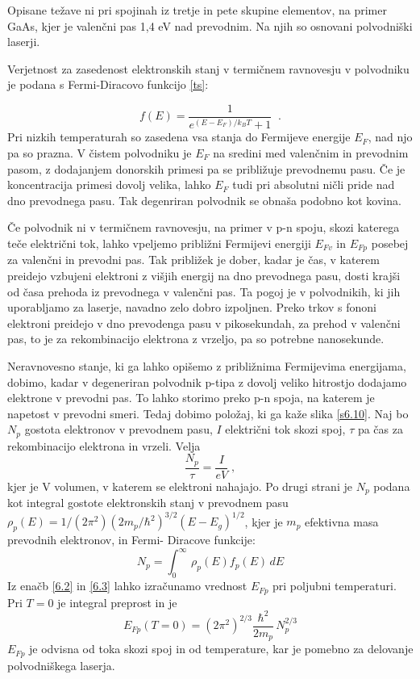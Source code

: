 Opisane težave ni pri spojinah iz tretje in pete skupine elementov, na
primer GaAs, kjer je valenčni pas 1,4 eV nad prevodnim. Na njih so osnovani
polvodniški laserji.

Verjetnost za zasedenost elektronskih stanj v termičnem ravnovesju v
polvodniku je podana s Fermi-Diracovo funkcijo \ref{ts}:

\begin{equation}  \label{6.1}
f(E)=\frac{1}{e^{(E-E_F)/k_B T}+1}\;\;.
\end{equation}
Pri nizkih temperaturah so zasedena vsa stanja do Fermijeve energije $E_F$,
nad njo pa so prazna. V čistem polvodniku je $E_F$ na sredini med
valenčnim in prevodnim pasom, z dodajanjem donorskih primesi pa se
približuje prevodnemu pasu. Če je koncentracija primesi dovolj velika,
lahko $E_F$ tudi pri absolutni ničli pride nad dno prevodnega pasu. Tak
degenriran polvodnik se obnaša podobno kot kovina.

Če polvodnik ni v termičnem ravnovesju, na primer v p-n spoju, skozi
katerega teče električni tok, lahko vpeljemo približni Fermijevi energiji 
$E_{Fv}$ in $E_{Fp}$ posebej za valenčni in prevodni pas. Tak približek je
dober, kadar je čas, v katerem preidejo vzbujeni elektroni z višjih
energij na dno prevodnega pasu, dosti krajši od časa prehoda iz prevodnega
v valenčni pas. Ta pogoj je v polvodnikih, ki jih uporabljamo za laserje,
navadno zelo dobro izpoljnen. Preko trkov s fononi elektroni preidejo v dno
prevodenga pasu v pikosekundah, za prehod v valenčni pas, to je za
rekombinacijo elektrona z vrzeljo, pa so potrebne nanosekunde.

Neravnovesno stanje, ki ga lahko opišemo z približnima Fermijevima
energijama, dobimo, kadar v degeneriran polvodnik p-tipa z dovolj veliko
hitrostjo dodajamo elektrone v prevodni pas. To lahko storimo preko p-n
spoja, na katerem je napetost v prevodni smeri. Tedaj dobimo položaj, ki ga
kaže slika \ref{s6.10}. Naj bo $N_p$ gostota elektronov v prevodnem pasu, $I
$ električni tok skozi spoj, $\tau$ pa čas za rekombinacijo elektrona in
vrzeli. Velja 
\begin{equation}  \label{6.2}
\frac{N_p}{\tau}=\frac{I}{e V}\;,
\end{equation}
kjer je V volumen, v katerem se elektroni nahajajo. Po drugi strani je $N_p$
podana kot integral gostote elektronskih stanj v prevodnem pasu $%
\rho_p(E)=1/(2\pi^2)(2m_p/\hbar^2)^{3/2}(E-E_g)^{1/2}$, kjer je $m_p$
efektivna masa prevodnih elektronov, in Fermi- Diracove funkcije: 
\begin{equation}  \label{6.3}
N_p=\int_{0}^{\infty}\,\rho_p(E)f_p(E)\,dE
\end{equation}
Iz enačb \ref{6.2} in \ref{6.3} lahko izračunamo vrednost $E_{Fp}$ pri
poljubni temperaturi. Pri $T=0$ je integral preprost in je 
\begin{equation}  \label{6.4}
E_{Fp}(T=0)=(2\pi^2)^{2/3}\frac{\hbar^2}{2m_p}\,N_p^{2/3}
\end{equation}
$E_{Fp}$ je odvisna od toka skozi spoj in od temperature, kar je pomebno za
delovanje polvodniškega laserja.


